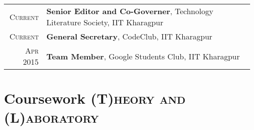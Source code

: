 \documentclass[a4paper,10pt]{extarticle} %
\begin{document}
\begin{tabular}{r|p{15cm}}
\textsc{Current} & \textbf{Senior Editor and Co-Governer}, Technology Literature Society, IIT Kharagpur \\
\textsc{Current} & \textbf{General Secretary}, CodeClub, IIT Kharagpur \\
\textsc{Apr 2015} & \textbf{Team Member}, Google Students Club, IIT Kharagpur \\
\end{tabular}


\section{Coursework
\hfill\small\textsc{(T)heory and (L)aboratory}}
\end{document}
